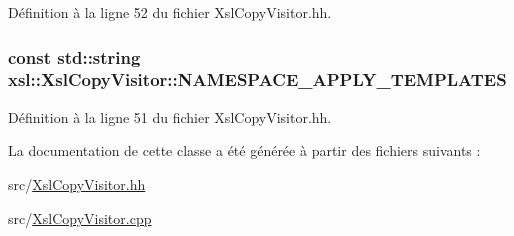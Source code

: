 Définition à la ligne 52 du fichier XslCopyVisitor.hh.

\hypertarget{classxsl_1_1_xsl_copy_visitor_a9b0a28eb3efa498aeb497f258ddc6de4}{
\subsubsection[{NAMESPACE\_\-APPLY\_\-TEMPLATES}]{\setlength{\rightskip}{0pt plus 5cm}const std::string {\bf xsl::XslCopyVisitor::NAMESPACE\_\-APPLY\_\-TEMPLATES}}}
\label{classxsl_1_1_xsl_copy_visitor_a9b0a28eb3efa498aeb497f258ddc6de4}


Définition à la ligne 51 du fichier XslCopyVisitor.hh.



La documentation de cette classe a été générée à partir des fichiers suivants :\begin{DoxyCompactItemize}
\item 
src/\hyperlink{_xsl_copy_visitor_8hh}{XslCopyVisitor.hh}\item 
src/\hyperlink{_xsl_copy_visitor_8cpp}{XslCopyVisitor.cpp}\end{DoxyCompactItemize}
